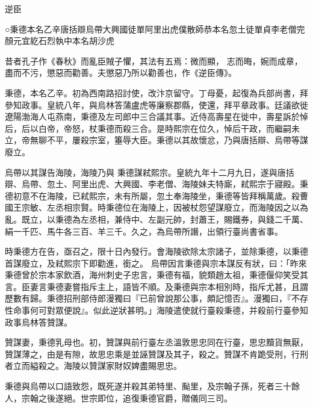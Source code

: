 
\begin{pinyinscope}

 逆臣



 ○秉德本名乙辛唐括辯烏帶大興國徒單阿里出虎僕散師恭本名忽土徒單貞李老僧完顏元宜紇石烈執中本名胡沙虎



 昔者孔子作《春秋》而亂臣賊子懼，其法有五焉：微而顯，
 志而晦，婉而成章，盡而不污，懲惡而勸善。夫懲惡乃所以勸善也，作《逆臣傳》。



 秉德，本名乙辛。初為西南路招討使，改汴京留守。丁母憂，起復為兵部尚書，拜參知政事。皇統八年，與烏林答蒲盧虎等廉察郡縣，使還，拜平章政事。廷議欲徙遼陽渤海人屯燕南，秉德及左司郎中三合議其事。近侍高壽星在徙中，壽星訴於悼后，后以白帝，帝怒，杖秉德而殺三合。是時熙宗在位久，悼后干政，而繼嗣未立，帝無聊不平，屢殺宗室，箠辱大臣。秉德以其故懷忿，乃與唐括辯、烏帶等謀廢立。



 烏帶以其謀告海陵，海陵乃與
 秉德謀弒熙宗。皇統九年十二月九日，遂與唐括辯、烏帶、忽土、阿里出虎、大興國、李老僧、海陵妹夫特廝，弒熙宗于寢殿。秉德初意不在海陵，已弒熙宗，未有所屬，忽土奉海陵坐，秉德等皆拜稱萬歲。殺曹國王宗敏、左丞相宗賢。時秉德位在海陵上，因被杖怨望謀廢立，而海陵因之以為亂。既立，以秉德為左丞相，兼侍中、左副元帥，封蕭王，賜鐵券，與錢二千萬、絹一千匹、馬牛各三百、羊三千。久之，為烏帶所譖，出領行臺尚書省事。



 時秉德方在告，亟召之，限十日內發行。會海陵欲除太宗諸子，並除秉德，以秉德首謀廢立，及弒熙宗下即勸進，銜之。
 烏帶因言秉德與宗本謀反有狀，曰：「昨來秉德曾於宗本家飲酒，海州刺史子忠言，秉德有福，貌類趙太祖，秉德偃仰笑受其言。臣妻言秉德妻嘗指斥主上，語皆不順。及秉德與宗本相別時，指斥尤甚，且謂歷數有歸。秉德招刑部侍郎漫獨曰『已前曾說那公事，頗記憶否』。漫獨曰，『不存性命事何可對眾便說』。似此逆狀甚明。」海陵遣使就行臺殺秉德，并殺前行臺參知政事烏林答贊謀。



 贊謀妻，秉德乳母也。初，贊謀與前行臺左丞溫敦思忠同在行臺，思忠黷貨無厭，贊謀薄之，由是有隙，故思忠乘是並誣贊謀及其子，殺之。贊謀不肯跪受刑，行刑
 者立而縊殺之。海陵以贊謀家財奴婢盡賜思忠。



 秉德與烏帶以口語致怨，既死遂并殺其弟特里、颭里，及宗翰子孫，死者三十餘人，宗翰之後遂絕。世宗即位，追復秉德官爵，贈儀同三司。




\end{pinyinscope}
